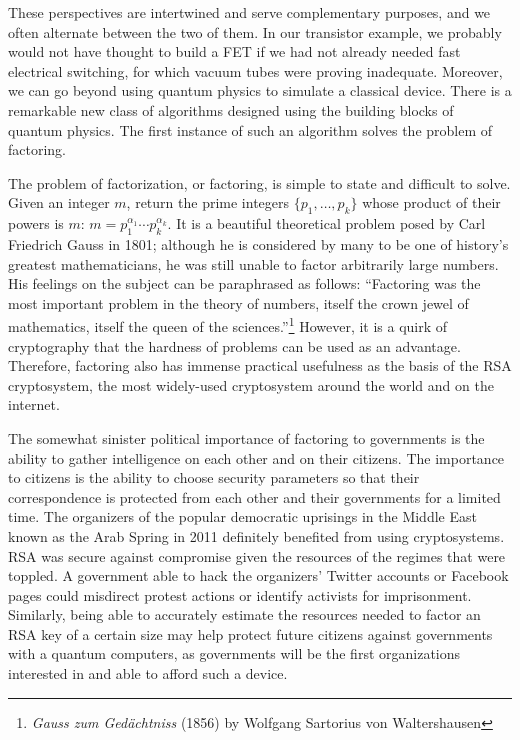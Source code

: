 These perspectives are intertwined and serve complementary purposes,
and we often alternate
between the two of them. In our transistor example, we probably would not
have thought to build a FET if we had not already needed fast electrical
switching, for which vacuum tubes were proving inadequate. Moreover, we can
go beyond using quantum physics to simulate a classical device. There is
a remarkable new class of algorithms designed using the building blocks of
quantum physics. The first instance of such an algorithm solves the problem
of factoring.

The problem of factorization, or factoring,
is simple to state and difficult to solve.
Given an integer $m$, return the prime integers $\{p_1, \ldots, p_k\}$ whose
product of their powers is $m$: $m = p_1^{\alpha_1}\cdots p_k^{\alpha_k}$.
It is a beautiful theoretical problem posed by Carl Friedrich Gauss in 1801;
although he is considered by many to be one of history's greatest mathematicians,
he was still unable to factor arbitrarily large numbers. 
His feelings on the subject can be paraphrased as follows:
``Factoring was the most important problem in the theory of
numbers, itself the crown jewel of mathematics, itself
the queen of the sciences.''\footnote{\emph{Gauss zum Ged\"achtniss} (1856) by
Wolfgang Sartorius von Waltershausen}
However,
it is a quirk of cryptography that the hardness of problems can be used as
an advantage. Therefore, factoring also has immense practical
usefulness as the basis of the RSA cryptosystem, the most widely-used
cryptosystem around the world and on the internet.

The somewhat sinister political importance of factoring to
governments is the ability to gather intelligence on each other and on their
citizens. The importance to citizens is the ability to choose security
parameters so that their correspondence is protected from each other and
their governments for a limited time.
The organizers of the popular democratic uprisings in the Middle East known
as the Arab Spring in 2011 definitely benefited from using cryptosystems.
RSA was
secure against compromise given the resources of the regimes that were
toppled.
A government able to hack the organizers' Twitter accounts or Facebook pages
could misdirect protest actions or identify activists for imprisonment.
Similarly, being able to accurately estimate the resources needed to factor
an RSA key of a certain size may help protect future citizens against
governments with a quantum computers, as governments will be the first
organizations interested in and able to afford such a device.


